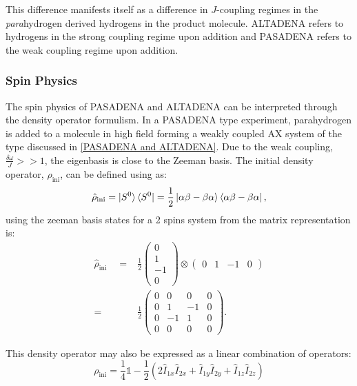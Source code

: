  This difference manifests itself as a difference in $J$-coupling regimes in the \textit{para}hydrogen derived hydrogens in
 the product molecule. ALTADENA refers to hydrogens in the strong coupling regime upon addition and PASADENA refers to the weak coupling regime
 upon addition.


 \subsubsection{Spin Physics}

 The spin physics of PASADENA and ALTADENA can be interpreted through the density operator formulism. In a
 PASADENA type experiment, parahydrogen is added to a molecule in high field forming a weakly coupled AX
 system of the type discussed in \ref{PASADENA and ALTADENA}. Due to the weak coupling, $\frac{\delta{\omega}}{J}>>1$, the eigenbasis is close to the
 Zeeman basis. The initial density operator, $\hat{\rho}_{\text{ini}}$, can be defined using
  as:
 \begin{equation}
   \hat{\rho}_{\text{ini}} = \ket{S^0}\bra{S^0} = \frac{1}{2}\ket{\alpha\beta -
   \beta\alpha}\bra{\alpha\beta - \beta\alpha},
 \end{equation}
 using the zeeman basis states for a 2 spins system from  the
 matrix representation is:
 \begin{align}
   \hat{\rho}_{\text{ini}}\quad=& \frac{1}{2} \begin{pmatrix}
   0\\
   1\\
   -1\\
   0
   \end{pmatrix} \otimes \begin{pmatrix}
     0 & 1 & -1 & 0
     \end{pmatrix}\\
   =& \frac{1}{2}\begin{pmatrix}
   0 & 0 & 0 & 0\\
   0 & 1 & -1 & 0\\
   0 & -1 & 1 & 0\\
   0 & 0 & 0 & 0
 \end{pmatrix}.
 \end{align}

This density operator may also be expressed as a linear combination of operators:
\begin{equation}
  \rho_{\text{ini}} = \frac{1}{4}\mathbb{1} - \frac{1}{2}(2\hat{I}_{1x}\hat{I}_{2x} + \hat{I}_{1y}\hat{I}_{2y} + \hat{I}_{1z}\hat{I}_{2z})
\end{equation}

